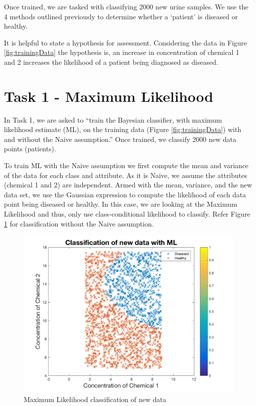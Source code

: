 Once trained, we are tasked with classifying 2000 new urine samples. We use the 4 methods outlined previously to determine whether a `patient' is diseased or healthy. 

It is helpful to state a hypothesis for assessment. Considering the data in Figure \ref{fig:trainingData} the hypothesis is, an increase in concentration of chemical 1 and 2 increases the likelihood of a patient being diagnosed as diseased.

\section{Task 1 - Maximum Likelihood}
In Task 1, we are asked to ``train the Bayesian classifier, with maximum likelihood estimate (ML), on the training data (Figure \ref{fig:trainingData}) with and without the Naive assumption.'' Once trained, we classify 2000 new data points (patients).

To train ML with the Naive assumption we first compute the mean and variance of the data for each class and attribute. As it is Naive, we assume the attributes (chemical 1 and 2) are independent. Armed with the mean, variance, and the new data set, we use the Gaussian expression to compute the likelihood of each data point being diseased or healthy. In this case, we are looking at the Maximum Likelihood and thus, only use class-conditional likelihood to classify. Refer Figure \ref{fig:ML} for classification without the Naive assumption.

\begin{figure}[h]
	\centering
	\includegraphics[width=0.8\linewidth]{images/MLnewData}
	\caption{Maximum Likelihood classification of new data}
	\label{fig:ML}
\end{figure}

